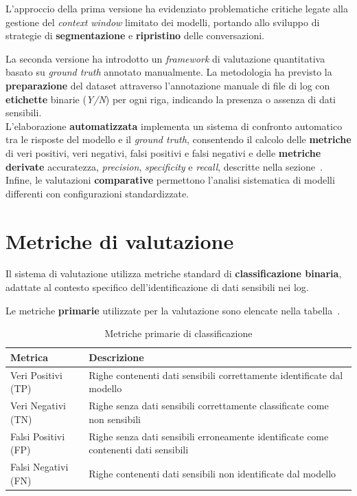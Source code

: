 \documentclass[12pt,twoside]{report}
\begin{document}
L'approccio della prima versione ha evidenziato problematiche critiche legate alla gestione del \textit{context window} limitato dei modelli, portando allo sviluppo di strategie di \textbf{segmentazione} e \textbf{ripristino} delle conversazioni.

La seconda versione ha introdotto un \textit{framework} di valutazione quantitativa basato su \textit{ground truth} annotato manualmente. La metodologia ha previsto la \textbf{preparazione} del dataset attraverso l'annotazione manuale di file di log con \textbf{etichette} binarie (\textit{Y/N}) per ogni riga, indicando la presenza o assenza di dati sensibili.\\
L'elaborazione \textbf{automatizzata} implementa un sistema di confronto automatico tra le risposte del modello e il \textit{ground truth}, consentendo il calcolo delle \textbf{metriche} di veri positivi, veri negativi, falsi positivi e falsi negativi e delle \textbf{metriche derivate} accuratezza, \textit{precision}, \textit{specificity} e \textit{recall}, descritte nella sezione~. Infine, le valutazioni \textbf{comparative} permettono l'analisi sistematica di modelli differenti con configurazioni standardizzate.

\section{Metriche di valutazione}
\label{sec:metriche_test}

Il sistema di valutazione utilizza metriche standard di \textbf{classificazione binaria}, adattate al contesto specifico dell'identificazione di dati sensibili nei log.

Le metriche \textbf{primarie} utilizzate per la valutazione sono elencate nella tabella~.

\begin{table}[h!]
    \centering
    \begin{tabular}{|p{}|p{}|}
        \hline
        \textbf{Metrica} & \textbf{Descrizione} \\
        \hline
        Veri Positivi (TP) & Righe contenenti dati sensibili correttamente identificate dal modello \\
        \hline
        Veri Negativi (TN) & Righe senza dati sensibili correttamente classificate come non sensibili \\
        \hline
        Falsi Positivi (FP) & Righe senza dati sensibili erroneamente identificate come contenenti dati sensibili \\
        \hline
        Falsi Negativi (FN) & Righe contenenti dati sensibili non identificate dal modello \\
        \hline
    \end{tabular}
    \caption{Metriche primarie di classificazione}
    \label{tab:metriche_primarie}
\end{table}
\end{document}
